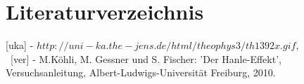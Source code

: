 \newpage
\section{Literaturverzeichnis}
[uka] - $http://uni-ka.the-jens.de/html/theophys3/th1392x.gif$,\\
~[ver] - M.Köhli, M. Gessner und S. Fischer: 'Der Hanle-Effekt', Versuchsanleitung, Albert-Ludwigs-Universität Freiburg, 2010.